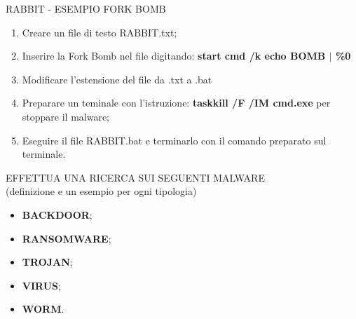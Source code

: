 \documentclass[aspectratio=1610]{beamer}
\begin{document}
\begin{frame}{RABBIT - ESEMPIO FORK BOMB}
    \begin{enumerate}
        \item Creare un file di testo RABBIT.txt;
        \pause
        \item Inserire la Fork Bomb nel file digitando: \textbf{start cmd /k echo BOMB \textbf{$\mid$} \%0}
        \pause
        \item Modificare l’estensione del ﬁle da .txt a .bat
        \pause
        \item Preparare un teminale con l'istruzione: \textbf{taskkill /F /IM cmd.exe} per stoppare il malware;
        \pause
        \item Eseguire il file RABBIT.bat e terminarlo con il comando preparato sul terminale.
    \end{enumerate}                        
\end{frame}

\begin{frame}{EFFETTUA UNA RICERCA SUI SEGUENTI MALWARE\\(definizione e un esempio per ogni tipologia)}
    \begin{itemize}
        \item \textbf{BACKDOOR};
        \item \textbf{RANSOMWARE};
        \item \textbf{TROJAN};
        \item \textbf{VIRUS};
        \item \textbf{WORM}.
    \end{itemize}                        
\end{frame}
\end{document}
